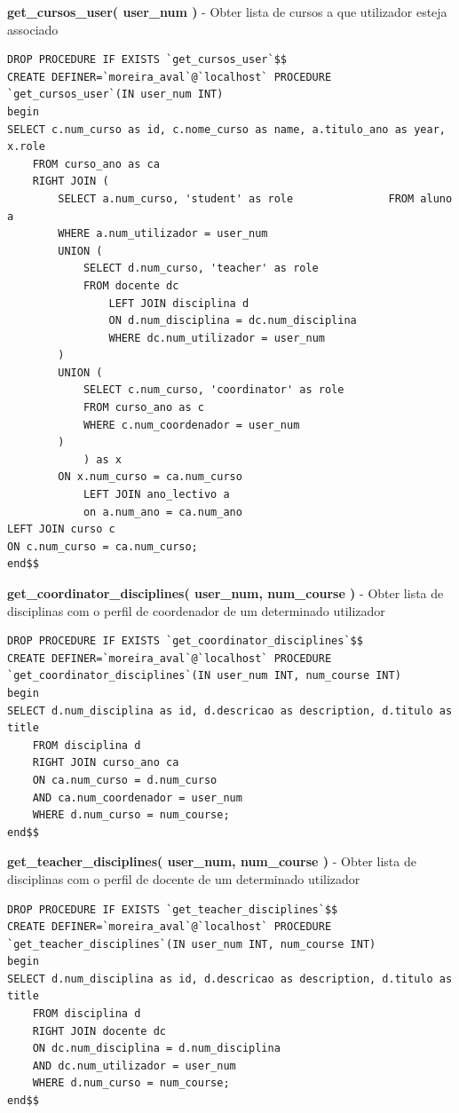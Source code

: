 \begin{list}{\textbf{-}}{\textbf{STORED PROCEDURES}}
\item \textbf{get\_cursos\_user( user\_num )} - Obter lista de cursos a que utilizador esteja associado
\begin{lstlisting}
DROP PROCEDURE IF EXISTS `get_cursos_user`$$
CREATE DEFINER=`moreira_aval`@`localhost` PROCEDURE `get_cursos_user`(IN user_num INT)
begin
SELECT c.num_curso as id, c.nome_curso as name, a.titulo_ano as year, x.role
	FROM curso_ano as ca
	RIGHT JOIN (
		SELECT a.num_curso, 'student' as role				FROM aluno a
		WHERE a.num_utilizador = user_num
		UNION (
			SELECT d.num_curso, 'teacher' as role
			FROM docente dc
				LEFT JOIN disciplina d
				ON d.num_disciplina = dc.num_disciplina
				WHERE dc.num_utilizador = user_num
		)
		UNION (
			SELECT c.num_curso, 'coordinator' as role
			FROM curso_ano as c
			WHERE c.num_coordenador = user_num
		)
			) as x
		ON x.num_curso = ca.num_curso
			LEFT JOIN ano_lectivo a
			on a.num_ano = ca.num_ano
LEFT JOIN curso c
ON c.num_curso = ca.num_curso;
end$$
\end{lstlisting}

\item \textbf{get\_coordinator\_disciplines( user\_num, num\_course )} - Obter lista de disciplinas com o perfil de coordenador de um determinado utilizador
\begin{lstlisting}
DROP PROCEDURE IF EXISTS `get_coordinator_disciplines`$$
CREATE DEFINER=`moreira_aval`@`localhost` PROCEDURE `get_coordinator_disciplines`(IN user_num INT, num_course INT)
begin
SELECT d.num_disciplina as id, d.descricao as description, d.titulo as title
	FROM disciplina d
	RIGHT JOIN curso_ano ca
	ON ca.num_curso = d.num_curso
	AND ca.num_coordenador = user_num
	WHERE d.num_curso = num_course;
end$$
\end{lstlisting}

\item \textbf{get\_teacher\_disciplines( user\_num, num\_course )} - Obter lista de disciplinas com o perfil de docente de um determinado utilizador
\begin{lstlisting}
DROP PROCEDURE IF EXISTS `get_teacher_disciplines`$$
CREATE DEFINER=`moreira_aval`@`localhost` PROCEDURE `get_teacher_disciplines`(IN user_num INT, num_course INT)
begin
SELECT d.num_disciplina as id, d.descricao as description, d.titulo as title
	FROM disciplina d
	RIGHT JOIN docente dc
	ON dc.num_disciplina = d.num_disciplina
	AND dc.num_utilizador = user_num
	WHERE d.num_curso = num_course;
end$$
\end{lstlisting}


\end{list}

